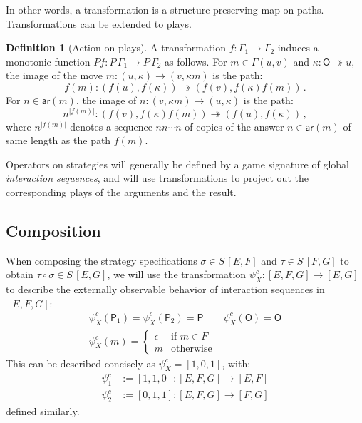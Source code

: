 \documentclass[draft,11pt]{report}
\theoremstyle{definition}
\newtheorem{definition}[theorem]{Definition}
\newcommand{\kw}[1]{\ensuremath{ \mathsf{#1} }}
\begin{document}
In other words,
a transformation
is a structure-preserving map on paths.
Transformations can be extended to plays.

\begin{definition}[Action on plays]
A transformation
$f : \Gamma_1 \rightarrow \Gamma_2$
induces a monotonic function
$P f  : P \, \Gamma_1 \rightarrow P \, \Gamma_2$
as follows.
For $m \in \Gamma(u, v)$ and $\kappa : \kw{O} \twoheadrightarrow u$,
the image of the move
$m : (u, \kappa) \rightarrow (v, \kappa m)$
is the path:
\[
 f(m) : (f(u), f(\kappa)) \twoheadrightarrow
        (f(v), f(\kappa) f(m)) \,.
\]
For $n \in \kw{ar}(m)$,
the image of
$n : (v, \kappa m) \rightarrow (u, \kappa)$
is the path:
\[
 n^{|f(m)|} : (f(v), f(\kappa) f(m)) \twoheadrightarrow
              (f(u), f(\kappa)) \,,
\]
where $n^{|f(m)|}$ denotes a sequence $nn \cdots n$
of copies of the answer $n \in \kw{ar}(m)$
of same length as the path $f(m)$.
\end{definition}

Operators on strategies will generally be defined
by a game signature of global \emph{interaction sequences},
and will use transformations to project out
the corresponding plays of the arguments and the result.

\subsection{Composition} %

When composing the strategy specifications
$\sigma \in S \, [E, F]$ and
$\tau \in S \, [F, G]$
to obtain $\tau \circ \sigma \in S \, [E, G]$,
we will use the transformation
$\psi^c_X : [E,F,G] \rightarrow [E,G]$
to describe the externally observable behavior
of interaction sequences in $[E,F,G]$:
\begin{gather*}
  \psi^c_X(\kw{P}_1) = \psi^c_X(\kw{P}_2) = \kw{P} \qquad
  \psi^c_X(\kw{O}) = \kw{O}
  \\
  \psi^c_X(m) = \begin{cases}
    \epsilon & \text{if } m \in F \\
    m & \text{otherwise}
  \end{cases}
\end{gather*}
This can be described concisely as
$\psi^c_X = [1,0,1]$,
with:
\begin{align*}
  \psi^c_1 &:= [1,1,0] :
    [E,F,G] \rightarrow [E,F] \\
  \psi^c_2 &:= [0,1,1] :
     [E,F,G] \rightarrow [F,G]
\end{align*}
defined similarly.
\end{document}
